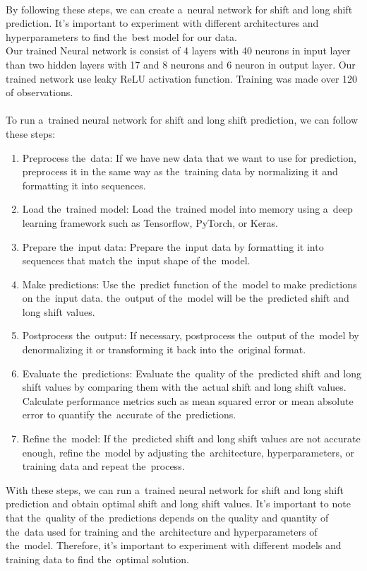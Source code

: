         \\
        By following these steps, we can create a~neural network for shift and long shift prediction.
        It's important to experiment with different architectures and hyperparameters to find the~best
        model for our data.\\
        Our trained Neural network is consist of 4 layers with 40 neurons in input layer than two
        hidden layers with 17 and 8 neurons and 6 neuron in output layer. Our trained network
        use leaky ReLU activation function. Training was made over 120 of observations.\\
        \\
        To run a~trained neural network for shift and long shift prediction, we can follow these steps:
        \begin{enumerate}
            \item Preprocess the~data: If we have new data that we want to use for prediction, preprocess it in the
            same way as the~training data by normalizing it and formatting it into sequences.
            \item Load the~trained model: Load the~trained model into memory using a~deep learning framework such as
            Tensorflow, PyTorch, or Keras.
            \item Prepare the~input data: Prepare the~input data by formatting it into sequences that match the~input
            shape of the~model.
            \item Make predictions: Use the~predict function of the~model to make predictions on the~input data.
            the~output of the~model will be the~predicted shift and long shift values.
            \item Postprocess the~output: If necessary, postprocess the~output of the~model by denormalizing it or
            transforming it back into the~original format.
            \item Evaluate the~predictions: Evaluate the~quality of the~predicted shift and long shift values by
            comparing them with the~actual shift and long shift values. Calculate performance metrics such as mean
            squared error or mean absolute error to quantify the~accurate of the~predictions.
            \item Refine the~model: If the~predicted shift and long shift values are not accurate enough,
            refine the~model by adjusting the~architecture, hyperparameters, or training data and repeat the~process.
        \end{enumerate}
        With these steps, we can run a~trained neural network for shift and long shift prediction and obtain optimal
        shift and long shift values. It's important to note that the~quality of the~predictions depends on the
        quality and quantity of the~data used for training and the~architecture and hyperparameters of the~model.
        Therefore, it's important to experiment with different models and training data to find the~optimal solution.   
    
